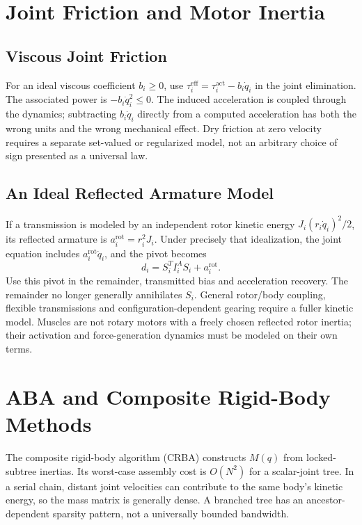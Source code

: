 \section{Joint Friction and Motor Inertia}
\label{sec:friction_motor_inertia}

\subsection{Viscous Joint Friction}
\label{subsec:joint_friction}

For an ideal viscous coefficient $b_i\ge0$, use $\tau_i^{\mathrm{eff}}=\tau_i^{\mathrm{act}}-b_i\dot q_i$ in the joint elimination. The associated power is $-b_i\dot q_i^2\le0$. The induced acceleration is coupled through the dynamics; subtracting $b_i\dot q_i$ directly from a computed acceleration has both the wrong units and the wrong mechanical effect. Dry friction at zero velocity requires a separate set-valued or regularized model, not an arbitrary choice of sign presented as a universal law.

\subsection{An Ideal Reflected Armature Model}
\label{subsec:motor_inertia}

If a transmission is modeled by an independent rotor kinetic energy $J_i(r_i\dot q_i)^2/2$, its reflected armature is $a_i^{\mathrm{rot}}=r_i^2J_i$. Under precisely that idealization, the joint equation includes $a_i^{\mathrm{rot}}\ddot q_i$, and the pivot becomes
\begin{equation}
 d_i=S_i^T I_i^A S_i+a_i^{\mathrm{rot}}.
\end{equation}
Use this pivot in the remainder, transmitted bias and acceleration recovery. The remainder no longer generally annihilates $S_i$. General rotor/body coupling, flexible transmissions and configuration-dependent gearing require a fuller kinetic model. Muscles are not rotary motors with a freely chosen reflected rotor inertia; their activation and force-generation dynamics must be modeled on their own terms.

\section{ABA and Composite Rigid-Body Methods}
\label{sec:aba_vs_crba}

The composite rigid-body algorithm (CRBA) constructs $M(q)$ from locked-subtree inertias. Its worst-case assembly cost is $O(N^2)$ for a scalar-joint tree. In a serial chain, distant joint velocities can contribute to the same body's kinetic energy, so the mass matrix is generally dense. A branched tree has an ancestor-dependent sparsity pattern, not a universally bounded bandwidth.

